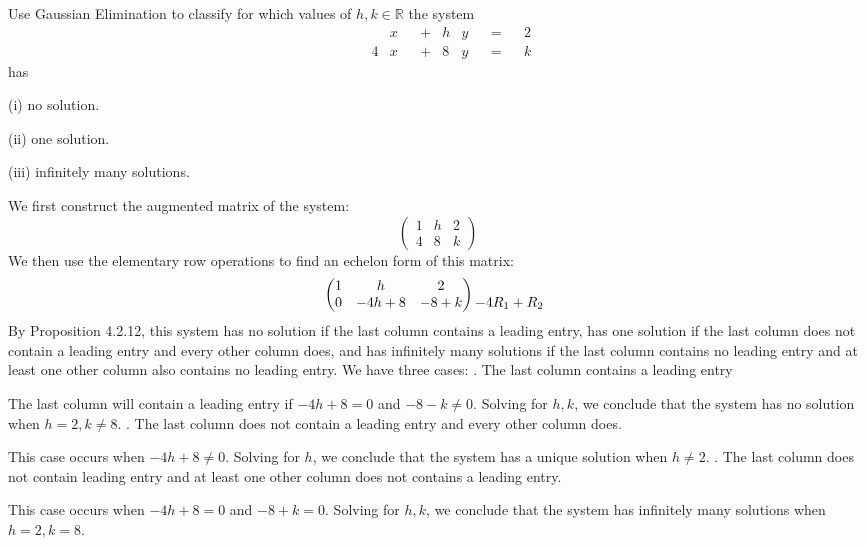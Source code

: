 \documentclass[12pt]{article}
\newenvironment{problem}[2][Problem]
{
	\begin{trivlist} 
		\item[\hskip \labelsep {\bfseries #1 #2:}]
	}
{
	\end{trivlist}
	}
\newenvironment{solution}[1][Solution]
{
	\begin{trivlist} 
		\item[\hskip \labelsep {\itshape #1:}]
	}
	{
	\end{trivlist}
}
\begin{document}
\newpage
\begin{problem}{5}
Use Gaussian Elimination to classify for which values of $h,k \in \mathbb{R}$ the system
\begin{align*}
&&&&&&&&&&&&&&&&&&&&&&&&&&&&&&&& &x&   &+& h&y&  &=& &2& &&&&&&&&&&&&&&&&&&&&&&&&&&&&&&&&\\
&&&&&&&&&&&&&&&&&&&&&&&&&&&&&&&& 4&x& &+&  8&y&   &=& &k&  &&&&&&&&&&&&&&&&&&&&&&&&&&&&&&&&
\end{align*}
has

\noindent
(i) no solution.

\noindent
(ii) one solution.

\noindent
(iii) infinitely many solutions.
\begin{solution}
We first construct the augmented matrix of the system:
\[
\begin{pmatrix} 1&h&2\\4&8&k \end{pmatrix}
\]
We then use the elementary row operations to find an echelon form of this matrix:
\begin{align*}
\begin{pmatrix} 1&h&2\\0&-4h+8&-8+k \end{pmatrix}
\begin{matrix} \hphantom{1}\\-4R_1+R_2 \hphantom{1} \end{matrix}\\
\end{align*}
By Proposition 4.2.12, this system has no solution if the last column contains a leading entry, has one solution if the last column does not contain a leading entry and every other column does, and has infinitely many solutions if the last column contains no leading entry and at least one other column also contains no leading entry. We have three cases:
\newline
\newline
{}. The last column contains a leading entry

The last column will contain a leading entry if $-4h+8=0$ and $-8-k \neq 0$. Solving for $h,k$, we conclude that the system has no solution when $h=2,k\neq 8$.
\newline
\newline
{}. The last column does not contain a leading entry and every other column does.

This case occurs when $-4h+8\neq 0$. Solving for $h$, we conclude that the system has a unique solution when $h\neq 2$.
\newline
\newline
{}. The last column does not contain leading entry and at least one other column does not contains a leading entry.

This case occurs when $-4h+8=0$ and $-8+k=0$. Solving for $h,k$, we conclude that the system has infinitely many solutions when $h=2, k=8$.
\end{solution}

\end{problem}
\end{document}
